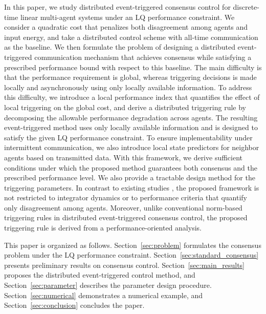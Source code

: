 \documentclass[letterpaper,10pt,conference]{ieeeconf}
\begin{document}
In this paper, we study distributed event-triggered consensus control for discrete-time linear multi-agent systems under an LQ performance constraint.
We consider a quadratic cost that penalizes both disagreement among agents and input energy, and take a distributed control scheme with all-time communication as the baseline.
We then formulate the problem of designing a distributed event-triggered communication mechanism that achieves consensus while satisfying a prescribed performance bound with respect to this baseline.
The main difficulty is that the performance requirement is global, whereas triggering decisions is made locally and asynchronously using only locally available information.
To address this difficulty, we introduce a local performance index that quantifies the effect of local triggering on the global cost, and derive a distributed triggering rule by decomposing the allowable performance degradation across agents.
The resulting event-triggered method uses only locally available information and is designed to satisfy the given LQ performance constraint.
To ensure implementability under intermittent communication, we also introduce local state predictors for neighbor agents based on transmitted data.
With this framework, we derive sufficient conditions under which the proposed method guarantees both consensus and the prescribed performance level.
We also provide a tractable design method for the triggering parameters.
In contrast to existing studies \cite{meister2022analysis,meister2024time,antunes2023consistent,meister2026improving}, the proposed framework is not restricted to integrator dynamics or to performance criteria that quantify only disagreement among agents.
Moreover, unlike conventional norm-based triggering rules in distributed event-triggered consensus control, the proposed triggering rule is derived from a performance-oriented analysis.

This paper is organized as follows.
Section~\ref{sec:problem} formulates the consensus problem under the LQ performance constraint.
Section~\ref{sec:standard_consensus} presents preliminary results on consensus control.
Section~\ref{sec:main_results} proposes the distributed event-triggered control method, and Section~\ref{sec:parameter} describes the parameter design procedure.
Section~\ref{sec:numerical} demonstrates a numerical example, and Section~\ref{sec:conclusion} concludes the paper.

\end{document}
